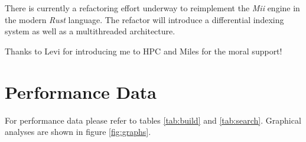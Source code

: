 \documentclass[manuscript,screen]{acmart}
\begin{document}
There is currently a refactoring effort underway to reimplement the \textit{Mii} engine in the modern \textit{Rust} language.
The refactor will introduce a differential indexing system as well as a multithreaded architecture.

\begin{acks}
Thanks to Levi for introducing me to HPC and Miles for the moral support!
\end{acks}




\appendix
\section{Performance Data}
For performance data please refer to tables \ref{tab:build} and \ref{tab:search}. Graphical analyses are shown in figure \ref{fig:graphs}.
\end{document}
